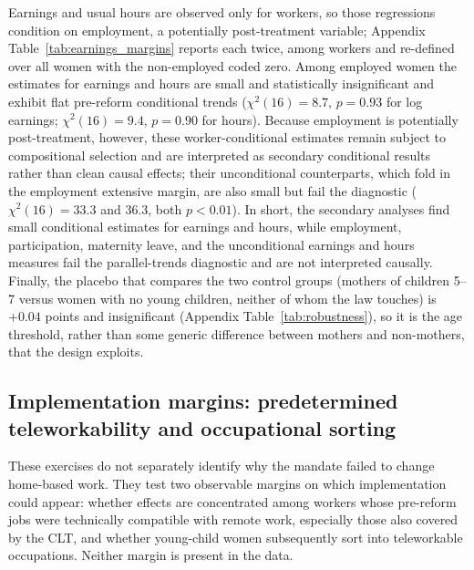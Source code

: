 \documentclass[12pt]{article}
\begin{document}
Earnings and usual hours are observed only for workers, so those regressions condition on employment, a potentially post-treatment variable; Appendix Table~\ref{tab:earnings_margins} reports each twice, among workers and re-defined over all women with the non-employed coded zero. Among employed women the estimates for earnings and hours are small and statistically insignificant and exhibit flat pre-reform conditional trends ($\chi^2(16)=8.7$, $p=0.93$ for log earnings; $\chi^2(16)=9.4$, $p=0.90$ for hours). Because employment is potentially post-treatment, however, these worker-conditional estimates remain subject to compositional selection and are interpreted as secondary conditional results rather than clean causal effects; their unconditional counterparts, which fold in the employment extensive margin, are also small but fail the diagnostic ($\chi^2(16)=33.3$ and $36.3$, both $p<0.01$). In short, the secondary analyses find small conditional estimates for earnings and hours, while employment, participation, maternity leave, and the unconditional earnings and hours measures fail the parallel-trends diagnostic and are not interpreted causally. Finally, the placebo that compares the two control groups (mothers of children 5--7 versus women with no young children, neither of whom the law touches) is $+0.04$ points and insignificant (Appendix Table~\ref{tab:robustness}), so it is the age threshold, rather than some generic difference between mothers and non-mothers, that the design exploits.

\subsection{Implementation margins: predetermined teleworkability and occupational sorting}\label{sec:mechanisms}

These exercises do not separately identify why the mandate failed to change home-based work. They test two observable margins on which implementation could appear: whether effects are concentrated among workers whose pre-reform jobs were technically compatible with remote work, especially those also covered by the CLT, and whether young-child women subsequently sort into teleworkable occupations. Neither margin is present in the data.
\end{document}
